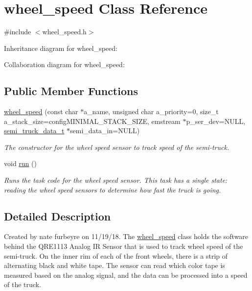 \hypertarget{classwheel__speed}{}\section{wheel\+\_\+speed Class Reference}
\label{classwheel__speed}


{\ttfamily \#include $<$wheel\+\_\+speed.\+h$>$}



Inheritance diagram for wheel\+\_\+speed\+:


Collaboration diagram for wheel\+\_\+speed\+:
\subsection*{Public Member Functions}
\begin{DoxyCompactItemize}
\item 
\hyperlink{classwheel__speed_ae6db94280adf28fc03e22260589f459a}{wheel\+\_\+speed} (const char $\ast$a\+\_\+name, unsigned char a\+\_\+priority=0, size\+\_\+t a\+\_\+stack\+\_\+size=config\+M\+I\+N\+I\+M\+A\+L\+\_\+\+S\+T\+A\+C\+K\+\_\+\+S\+I\+ZE, emstream $\ast$p\+\_\+ser\+\_\+dev=N\+U\+LL, \hyperlink{structsemi__truck__data__t}{semi\+\_\+truck\+\_\+data\+\_\+t} $\ast$semi\+\_\+data\+\_\+in=N\+U\+LL)
\begin{DoxyCompactList}\small\item\em The constructor for the wheel speed sensor to track speed of the semi-\/truck. \end{DoxyCompactList}\item 
void \hyperlink{classwheel__speed_a2f83d6307577461a406c90817b16bced}{run} ()\hypertarget{classwheel__speed_a2f83d6307577461a406c90817b16bced}{}\label{classwheel__speed_a2f83d6307577461a406c90817b16bced}

\begin{DoxyCompactList}\small\item\em Runs the task code for the wheel speed sensor. This task has a single state\+: reading the wheel speed sensors to determine how fast the truck is going. \end{DoxyCompactList}\end{DoxyCompactItemize}


\subsection{Detailed Description}
Created by nate furbeyre on 11/19/18. The \hyperlink{classwheel__speed}{wheel\+\_\+speed} class holds the software behind the Q\+R\+E1113 Analog IR Sensor that is used to track wheel speed of the semi-\/truck. On the inner rim of each of the front wheels, there is a strip of alternating black and white tape. The sensor can read which color tape is measured based on the analog signal, and the data can be processed into a speed of the truck.

